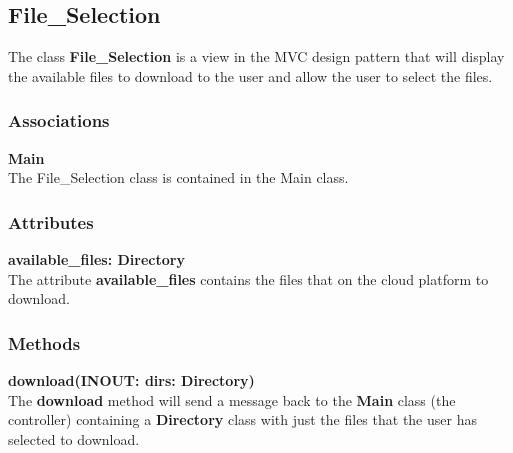\subsection{File\_Selection}
The class \textbf{File\_Selection} is a view in the MVC design pattern that will display
the available files to download to the user and allow the user to select the files.

\subsubsection{Associations}
\textbf{Main} \\
The File\_Selection class is contained in the Main class.

\subsubsection{Attributes}
\textbf{available\_files: Directory} \\
The attribute \textbf{available\_files} contains the files that on the cloud platform to
download.

\subsubsection{Methods}
\textbf{download(INOUT: dirs: Directory)} \\
The \textbf{download} method will send a message back to the \textbf{Main} class
(the controller) containing a \textbf{Directory} class with just the files that the user
has selected to download.

